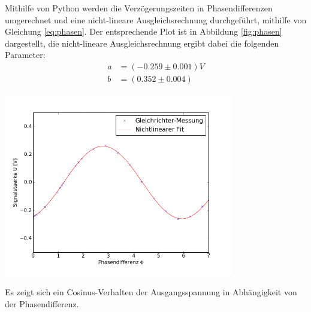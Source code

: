 \documentclass[]{scrartcl}
\begin{document}
Mithilfe von Python werden die Verzögerungszeiten in Phasendifferenzen umgerechnet und eine nicht-lineare Ausgleichsrechnung durchgeführt, mithilfe von Gleichung \ref{eq:phasen}. Der entsprechende Plot ist in Abbildung \ref{fig:phasen} dargestellt, die nicht-lineare Ausgleichsrechnung ergibt dabei die folgenden Parameter:
\begin{align}
a &= (-0.259 \pm 0.001) V \\
b &= ( 0.352 \pm 0.004) 
\end{align}
\begin{center}
	\includegraphics[width=10cm]{images/plotgleich.png}
	\label{fig:phasen}
\end{center}
Es zeigt sich ein Cosinus-Verhalten der Ausgangsspannung in Abhängigkeit von der Phasendifferenz.
\end{document}
